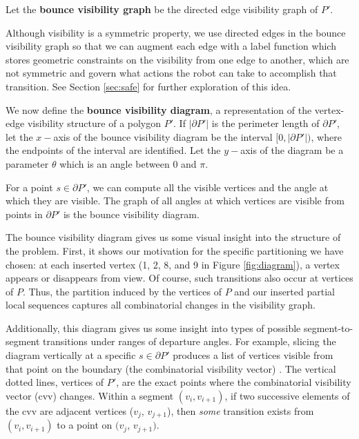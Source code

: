 \documentclass[]{styles/svproc}  %
\begin{document}
\begin{definition}
Let the \textbf{bounce visibility graph} be the directed edge visibility graph of
$P'$.
\end{definition}

Although visibility is a symmetric property, we use directed edges in the
bounce visibility graph so that 
we can augment each edge with a label function which stores
geometric constraints on the visibility from one edge to another, which are
not symmetric and govern what actions the robot can take to accomplish that
transition. See Section \ref{sec:safe} for further exploration of this idea.

We now define the \textbf{bounce visibility diagram}, a
representation of the vertex-edge visibility structure of a polygon $P'$.
If $|\partial P'|$ is the perimeter length of $\partial P'$, let the $x-$axis of the
bounce visibility diagram be the interval $[0, |\partial P'|)$, where the
endpoints of the interval are identified. Let the $y-$axis of the diagram be a
parameter $\theta$ which is an angle between $0$ and $\pi$.

For a point $s \in \partial P'$, we can compute all the visible vertices and
the angle at which they are visible. The graph of all angles at which vertices
are visible from points in $\partial P'$ is the bounce visibility diagram.

The bounce visibility diagram gives us some visual insight into the structure of
the problem. First, it shows our motivation for the specific partitioning we
have chosen: at each inserted vertex (1, 2, 8, and 9 in Figure
\ref{fig:diagram}), a vertex appears or disappears from view. Of course, such
transitions also occur at vertices of $P$. Thus, the partition induced by the
vertices of $P$ and our inserted partial local sequences captures all
combinatorial changes in the visibility graph.

Additionally, this diagram gives us some insight into types of possible
segment-to-segment transitions under ranges of departure angles. 
For example, slicing the diagram vertically at a specific $s \in \partial P'$
produces a list of vertices visible from that point on the boundary (the
combinatorial visibility vector) \cite{suri2008simple}. The vertical dotted
lines, vertices of $P'$, are the exact points where the combinatorial visibility
vector (cvv) changes. Within a segment $(v_i, v_{i+1})$, if two successive elements of the cvv are 
adjacent vertices ($v_j$, $v_{j+1}$), then \emph{some} transition exists from
$(v_i, v_{i+1})$ to a point on $(v_j$, $v_{j+1})$.
\end{document}
